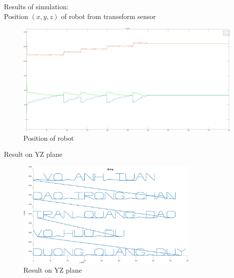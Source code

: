     \cleardoublepage
    Results of simulation: \\
    \hspace*{0.6cm}Position \( (x,y,z) \) of robot from transsform sensor
    \begin{figure}[H]
        \centering
        \includegraphics[width=1\textwidth]{pictures/xyz_pos_sensor.png}
        \caption{Position of robot}
        \label{fig:position}
    \end{figure}
    Result on YZ plane
    \begin{figure}[H]
        \centering
        \includegraphics[width=0.8\textwidth]{pictures/result_yz.png}
        \caption{Result on YZ plane}
        \label{fig:yz_plane}
    \end{figure}